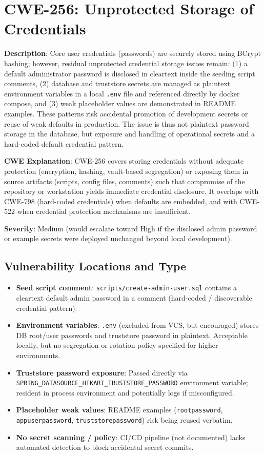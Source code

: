 \documentclass[]{UCD_CS_FYP_Report}
\begin{document}
\section{CWE-256: Unprotected Storage of Credentials}

	\textbf{Description}: Core user credentials (passwords) are securely stored using BCrypt hashing; however, residual unprotected credential storage issues remain: (1) a default administrator password is disclosed in cleartext inside the seeding script comments, (2) database and truststore secrets are managed as plaintext environment variables in a local \texttt{.env} file and referenced directly by docker compose, and (3) weak placeholder values are demonstrated in README examples. These patterns risk accidental promotion of development secrets or reuse of weak defaults in production. The issue is thus not plaintext password storage in the database, but exposure and handling of operational secrets and a hard-coded default credential pattern.

	\textbf{CWE Explanation}: CWE-256 covers storing credentials without adequate protection (encryption, hashing, vault-based segregation) or exposing them in source artifacts (scripts, config files, comments) such that compromise of the repository or workstation yields immediate credential disclosure. It overlaps with CWE-798 (hard-coded credentials) when defaults are embedded, and with CWE-522 when credential protection mechanisms are insufficient.

	\textbf{Severity}: Medium (would escalate toward High if the disclosed admin password or example secrets were deployed unchanged beyond local development).

\subsection*{Vulnerability Locations and Type}
\begin{itemize}
		\item \textbf{Seed script comment}: \texttt{scripts/create-admin-user.sql} contains a cleartext default admin password in a comment (hard-coded / discoverable credential pattern).
		\item \textbf{Environment variables}: \texttt{.env} (excluded from VCS, but encouraged) stores DB root/user passwords and truststore password in plaintext. Acceptable locally, but no segregation or rotation policy specified for higher environments.
		\item \textbf{Truststore password exposure}: Passed directly via \texttt{SPRING\_DATASOURCE\_HIKARI\_TRUSTSTORE\_PASSWORD} environment variable; resident in process environment and potentially logs if misconfigured.
		\item \textbf{Placeholder weak values}: README examples (\texttt{rootpassword}, \texttt{appuserpassword}, \texttt{truststorepassword}) risk being reused verbatim.
	\item \textbf{No secret scanning / policy}: CI/CD pipeline (not documented) lacks automated detection to block accidental secret commits.
\end{itemize}
\end{document}
